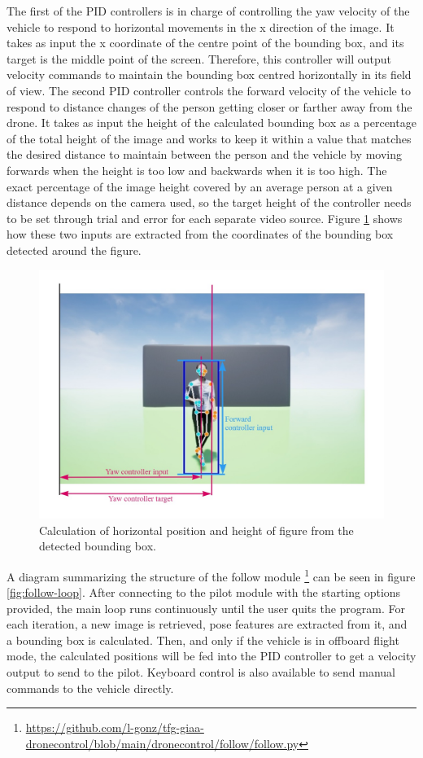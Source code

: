 The first of the PID controllers is in charge of controlling the yaw velocity of the vehicle to respond to horizontal movements in the x direction of the image.
It takes as input the x coordinate of the centre point of the bounding box, and its target is the middle point of the screen.
Therefore, this controller will output velocity commands to maintain the bounding box centred horizontally in its field of view.
The second PID controller controls the forward velocity of the vehicle to respond to distance changes of the person getting closer or farther away from the drone.
It takes as input the height of the calculated bounding box as a percentage of the total height of the image and works to keep it within a value that matches the desired distance to maintain between the person and the vehicle by moving forwards when the height is too low and backwards when it is too high.
The exact percentage of the image height covered by an average person at a given distance depends on the camera used, so the target height of the controller needs to be set through trial and error for each separate video source.
Figure \ref{fig:follow-input-calcs} shows how these two inputs are extracted from the coordinates of the bounding box detected around the figure.

\begin{figure}
  \centering
  \includegraphics[width=\textwidth, keepaspectratio]{img/pose-calculations.jpg}
  \caption{Calculation of horizontal position and height of figure from the detected bounding box.}
  \label{fig:follow-input-calcs}
\end{figure}


A diagram summarizing the structure of the follow module \footnote{\url{https://github.com/l-gonz/tfg-giaa-dronecontrol/blob/main/dronecontrol/follow/follow.py}} can be seen in figure \ref{fig:follow-loop}.
After connecting to the pilot module with the starting options provided, the main loop runs continuously until the user quits the program.
For each iteration, a new image is retrieved, pose features are extracted from it, and a bounding box is calculated.
Then, and only if the vehicle is in offboard flight mode, the calculated positions will be fed into the PID controller to get a velocity output to send to the pilot.
Keyboard control is also available to send manual commands to the vehicle directly.

